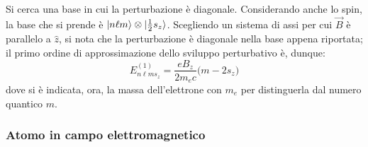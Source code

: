 \documentclass[11pt, a4paper]{scrartcl} %
\numberwithin{equation}{subsection}
\theoremstyle{style2}
\theoremstyle{style1}
\begin{document}
Si cerca una base in cui la perturbazione \`e diagonale. 
Considerando anche lo spin, la base che si prende \`e $\ket{n\ell m} \otimes \ket{\frac{1}{2} s_z} $.
Scegliendo un sistema di assi per cui $\vec{B} $ \`e parallelo a $\hat{z}$, si nota che la perturbazione \`e diagonale nella base appena riportata; il primo ordine di approssimazione dello sviluppo perturbativo \`e, dunque:
\begin{equation}
	E^{(1)} _{n\ell m s_z}  = \frac{e B_z}{2m_e c}\big(m - 2s_z\big)
\end{equation}
dove si \`e indicata, ora, la massa dell'elettrone con $m_e$ per distinguerla dal numero quantico $m$.

\subsubsection{Atomo in campo elettromagnetico}
\end{document}
